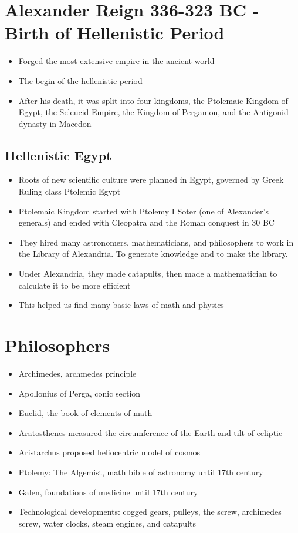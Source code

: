 \documentclass{article}
\begin{document}
\section{Alexander Reign 336-323 BC - Birth of Hellenistic Period}
\begin{itemize}
  \item Forged the most extensive empire in the ancient world
  \item The begin of the hellenistic period
  \item After his death, it was split into four
    kingdoms, the Ptolemaic Kingdom of Egypt, the Seleucid Empire,
    the Kingdom of Pergamon, and the Antigonid dynasty in Macedon
\end{itemize}

\subsection{Hellenistic Egypt}
\begin{itemize}
  \item Roots of new scientific culture were planned
    in Egypt, governed by Greek Ruling class
    Ptolemic Egypt
  \item Ptolemaic Kingdom started with Ptolemy I Soter
    (one of Alexander's generals) and ended with Cleopatra and
    the Roman conquest in 30 BC
  \item They hired many astronomers, mathematicians, and philosophers
    to work in the Library of Alexandria.
    To generate knowledge and to make the library.
  \item Under Alexandria, they made catapults, then
    made a mathematician to calculate it to be more efficient
  \item This helped us find many basic laws of math and physics
\end{itemize}


\section*{Philosophers}
\begin{itemize}
  \item Archimedes, archmedes principle
  \item Apollonius of Perga, conic section
  \item Euclid, the book of elements of math
  \item Aratosthenes measured the circumference of the Earth and
    tilt of ecliptic
  \item Aristarchus proposed heliocentric model of cosmos
  \item Ptolemy: The Algemist, math bible of astronomy until 17th century
  \item Galen, foundations of medicine until 17th century
  \item Technological developments: cogged gears, pulleys, the screw,
    archimedes screw, water clocks, steam engines, and catapults
\end{itemize}
\end{document}
